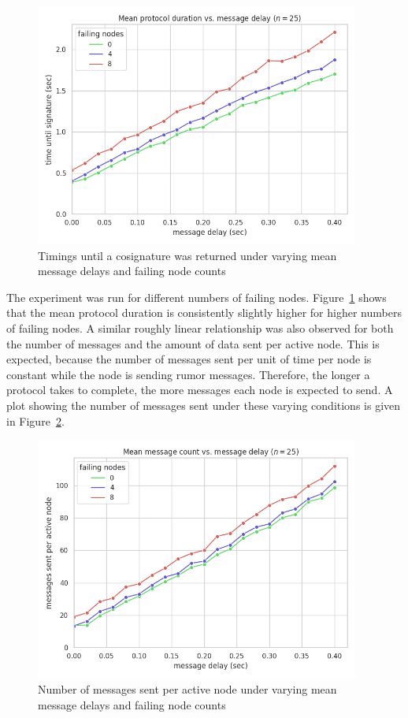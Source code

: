 \begin{figure}[!htbp]
    \centering
    \includegraphics[width=0.95\textwidth]{figures/2/round_wall_sum_by_delay.png}
    \caption{Timings until a cosignature was returned under varying mean message delays and failing node counts}
    \label{fig2time}
\end{figure}

The experiment was run for different numbers of failing nodes.
Figure~\ref{fig2time} shows that the mean protocol duration is consistently slightly higher for higher numbers of failing nodes.
A similar roughly linear relationship was also observed for both the number of messages and the amount of data sent per active node.
This is expected, because the number of messages sent per unit of time per node is constant while the node is sending rumor messages.
Therefore, the longer a protocol takes to complete, the more messages each node is expected to send.
A plot showing the number of messages sent under these varying conditions is given in Figure~\ref{fig2msg}.

\begin{figure}[!htbp]
    \centering
    \includegraphics[width=0.95\textwidth]{figures/2/bandwidth_msg_tx_sum_by_delay_big.png}
    \caption{Number of messages sent per active node under varying mean message delays and failing node counts}
    \label{fig2msg}
\end{figure}

